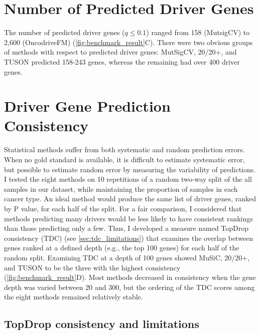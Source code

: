 \section{Number of Predicted Driver Genes}

The number of predicted driver genes ($q \leq 0.1$) ranged from 158 (MutsigCV) to 2,600 (OncodriveFM) (\autoref{fig:benchmark_result}C). There were two obvious groups of methods with respect to predicted driver genes: MutSigCV, 20/20+, and TUSON predicted 158-243 genes, whereas the remaining had over 400 driver genes.

\section{Driver Gene Prediction Consistency}

Statistical methods suffer from both systematic and random prediction errors. When no gold standard is available, it is difficult to estimate systematic error, but possible to estimate random error by measuring the variability of predictions. I tested the eight methods on 10 repetitions of a random two-way split of the all samples in our dataset, while maintaining the proportion of samples in each cancer type. An ideal method would produce the same list of driver genes, ranked by P value, for each half of the split. For a fair comparison, I considered that methods predicting many drivers would be less likely to have consistent rankings than those predicting only a few. Thus, I developed a measure named TopDrop consistency (TDC) (see \autoref{sec:tdc_limitations}) that examines the overlap between genes ranked at a defined depth (e.g., the top 100 genes) for each half of the random split. Examining TDC at a depth of 100 genes showed MuSiC, 20/20+, and TUSON to be the three with the highest consistency (\autoref{fig:benchmark_result}D). Most methods decreased in consistency when the gene depth was varied between 20 and 300, but the ordering of the TDC scores among the eight methods remained relatively stable.

\subsection{TopDrop consistency and limitations}
\label{sec:tdc_limitations}

